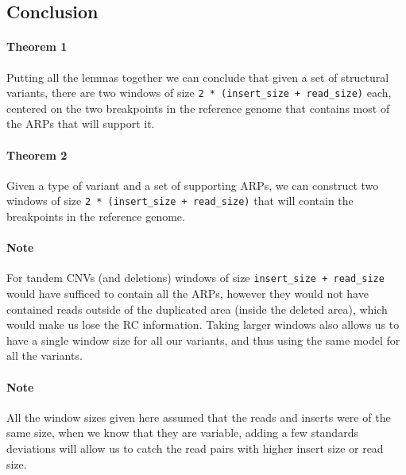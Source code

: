 \documentclass{article}
\begin{document}
\subsection{Conclusion}

\paragraph{Theorem 1} Putting all the lemmas together we can conclude that given a set of structural variants, there are two windows of size \verb|2 * (insert_size + read_size)| each, centered on the two breakpoints in the reference genome that contains most of the ARPs that will support it.

\paragraph{Theorem 2} Given a type of variant and a set of supporting ARPs, we can construct two windows of size \verb|2 * (insert_size + read_size)| that will contain the breakpoints in the reference genome.

\paragraph{Note} For tandem CNVs (and deletions) windows of size \verb|insert_size + read_size| would have sufficed to contain all the ARPs, however they would not have contained reads outside of the duplicated area (inside the deleted area), which would make us lose the RC information.
Taking larger windows also allows us to have a single window size for all our variants, and thus using the same model for all the variants.

\paragraph{Note} All the window sizes given here assumed that the reads and inserts were of the same size, when we know that they are variable, adding a few standards deviations will allow us to catch the read pairs with higher insert size or read size.
\end{document}
